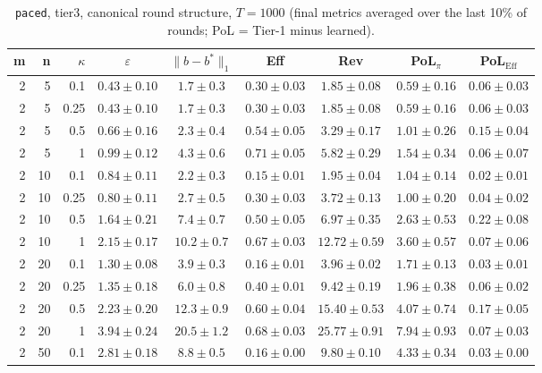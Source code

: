 \begin{table}[htbp]
\centering
\scriptsize
\caption{\texttt{paced}, tier3, canonical round structure, $T=1000$ (final metrics averaged over the last 10\% of rounds; PoL = Tier-1 minus learned).}
\label{tab:tier3_paced_canonical}
\begin{tabular}{@{}rrrcccccc@{}}
\toprule
m & n & $\kappa$ & $\varepsilon$ & $\|b-b^*\|_1$ & Eff & Rev & PoL$_\pi$ & PoL$_\mathrm{Eff}$ \\
\midrule
2 & 5 & 0.1 & $0.43 \pm 0.10$ & $1.7 \pm 0.3$ & $0.30 \pm 0.03$ & $1.85 \pm 0.08$ & $0.59 \pm 0.16$ & $0.06 \pm 0.03$ \\
2 & 5 & 0.25 & $0.43 \pm 0.10$ & $1.7 \pm 0.3$ & $0.30 \pm 0.03$ & $1.85 \pm 0.08$ & $0.59 \pm 0.16$ & $0.06 \pm 0.03$ \\
2 & 5 & 0.5 & $0.66 \pm 0.16$ & $2.3 \pm 0.4$ & $0.54 \pm 0.05$ & $3.29 \pm 0.17$ & $1.01 \pm 0.26$ & $0.15 \pm 0.04$ \\
2 & 5 & 1 & $0.99 \pm 0.12$ & $4.3 \pm 0.6$ & $0.71 \pm 0.05$ & $5.82 \pm 0.29$ & $1.54 \pm 0.34$ & $0.06 \pm 0.07$ \\
2 & 10 & 0.1 & $0.84 \pm 0.11$ & $2.2 \pm 0.3$ & $0.15 \pm 0.01$ & $1.95 \pm 0.04$ & $1.04 \pm 0.14$ & $0.02 \pm 0.01$ \\
2 & 10 & 0.25 & $0.80 \pm 0.11$ & $2.7 \pm 0.5$ & $0.30 \pm 0.03$ & $3.72 \pm 0.13$ & $1.00 \pm 0.20$ & $0.04 \pm 0.02$ \\
2 & 10 & 0.5 & $1.64 \pm 0.21$ & $7.4 \pm 0.7$ & $0.50 \pm 0.05$ & $6.97 \pm 0.35$ & $2.63 \pm 0.53$ & $0.22 \pm 0.08$ \\
2 & 10 & 1 & $2.15 \pm 0.17$ & $10.2 \pm 0.7$ & $0.67 \pm 0.03$ & $12.72 \pm 0.59$ & $3.60 \pm 0.57$ & $0.07 \pm 0.06$ \\
2 & 20 & 0.1 & $1.30 \pm 0.08$ & $3.9 \pm 0.3$ & $0.16 \pm 0.01$ & $3.96 \pm 0.02$ & $1.71 \pm 0.13$ & $0.03 \pm 0.01$ \\
2 & 20 & 0.25 & $1.35 \pm 0.18$ & $6.0 \pm 0.8$ & $0.40 \pm 0.01$ & $9.42 \pm 0.19$ & $1.96 \pm 0.38$ & $0.06 \pm 0.02$ \\
2 & 20 & 0.5 & $2.23 \pm 0.20$ & $12.3 \pm 0.9$ & $0.60 \pm 0.04$ & $15.40 \pm 0.53$ & $4.07 \pm 0.74$ & $0.17 \pm 0.05$ \\
2 & 20 & 1 & $3.94 \pm 0.24$ & $20.5 \pm 1.2$ & $0.68 \pm 0.03$ & $25.77 \pm 0.91$ & $7.94 \pm 0.93$ & $0.07 \pm 0.03$ \\
2 & 50 & 0.1 & $2.81 \pm 0.18$ & $8.8 \pm 0.5$ & $0.16 \pm 0.00$ & $9.80 \pm 0.10$ & $4.33 \pm 0.34$ & $0.03 \pm 0.00$ \\

\end{tabular}
\end{table}
